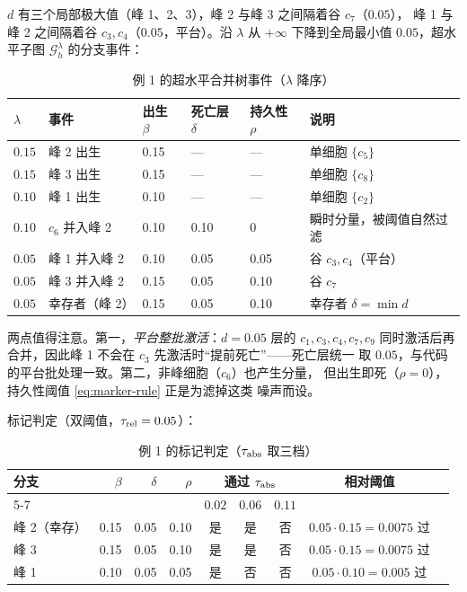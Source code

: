 \documentclass[UTF8,zihao=-4]{ctexart}
\begin{document}
$d$ 有三个局部极大值（峰 1、2、3），峰 2 与峰 3 之间隔着谷 $c_7$（$0.05$），
峰 1 与峰 2 之间隔着谷 $c_3,c_4$（$0.05$，平台）。沿 $\lambda$ 从 $+\infty$
下降到全局最小值 $0.05$，超水平子图 $\mathcal G_h^\lambda$ 的分支事件：

\begin{table}[htbp]
\centering
\caption{例 1 的超水平合并树事件（$\lambda$ 降序）}
\label{tab:ex1-tree}
\small
\begin{tabular}{llllll}
\toprule
$\lambda$ & 事件 & 出生 $\beta$ & 死亡层 $\delta$ & 持久性 $\rho$ & 说明\\
\midrule
$0.15$ & 峰 2 出生 & 0.15 & --- & --- & 单细胞 $\{c_5\}$\\
$0.15$ & 峰 3 出生 & 0.15 & --- & --- & 单细胞 $\{c_8\}$\\
$0.10$ & 峰 1 出生 & 0.10 & --- & --- & 单细胞 $\{c_2\}$\\
$0.10$ & $c_6$ 并入峰 2 & 0.10 & 0.10 & $0$ & 瞬时分量，被阈值自然过滤\\
$0.05$ & 峰 1 并入峰 2 & 0.10 & 0.05 & 0.05 & 谷 $c_3,c_4$（平台）\\
$0.05$ & 峰 3 并入峰 2 & 0.15 & 0.05 & 0.10 & 谷 $c_7$\\
$0.05$ & 幸存者（峰 2） & 0.15 & 0.05 & 0.10 & 幸存者 $\delta=\min d$\\
\bottomrule
\end{tabular}
\end{table}

两点值得注意。第一，\emph{平台整批激活}：$d=0.05$ 层的 $c_1,c_3,c_4,c_7,c_9$
同时激活后再合并，因此峰 1 不会在 $c_3$ 先激活时``提前死亡''——死亡层统一
取 $0.05$，与代码的平台批处理一致。第二，非峰细胞（$c_6$）也产生分量，
但出生即死（$\rho=0$），持久性阈值 \eqref{eq:marker-rule} 正是为滤掉这类
噪声而设。

标记判定（双阈值，$\tau_{\rm rel}=0.05$）：

\begin{table}[htbp]
\centering
\caption{例 1 的标记判定（$\tau_{\rm abs}$ 取三档）}
\label{tab:ex1-markers}
\small
\begin{tabularx}{\textwidth}{lrrrccccX}
\toprule
分支 & $\beta$ & $\delta$ & $\rho$ & \multicolumn{3}{c}{通过 $\tau_{\rm abs}$} & 相对阈值\\
\cmidrule(lr){5-7}
 & & & & $0.02$ & $0.06$ & $0.11$ &\\
\midrule
峰 2（幸存） & 0.15 & 0.05 & 0.10 & 是 & 是 & 否 & $0.05\cdot0.15=0.0075$ 过\\
峰 3 & 0.15 & 0.05 & 0.10 & 是 & 是 & 否 & $0.05\cdot0.15=0.0075$ 过\\
峰 1 & 0.10 & 0.05 & 0.05 & 是 & 否 & 否 & $0.05\cdot0.10=0.005$ 过\\
\bottomrule
\end{tabularx}
\end{table}
\end{document}
